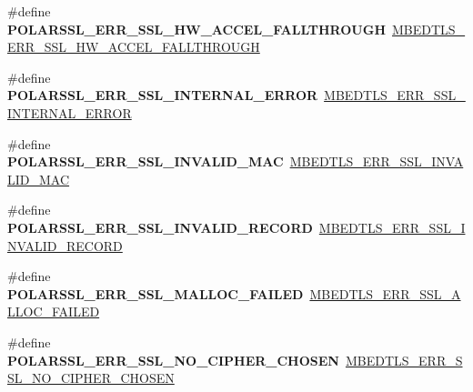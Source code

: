 \begin{DoxyCompactItemize}
\item 
\mbox{\label{compat-1_83_8h_a45a9cd8b2cb96afeed543fc57078e7d8}} 
\#define {\bfseries P\+O\+L\+A\+R\+S\+S\+L\+\_\+\+E\+R\+R\+\_\+\+S\+S\+L\+\_\+\+H\+W\+\_\+\+A\+C\+C\+E\+L\+\_\+\+F\+A\+L\+L\+T\+H\+R\+O\+U\+GH}~\mbox{\hyperlink{ssl_8h_af9328fb82f9548f4fa6bf3a5e1254c65}{M\+B\+E\+D\+T\+L\+S\+\_\+\+E\+R\+R\+\_\+\+S\+S\+L\+\_\+\+H\+W\+\_\+\+A\+C\+C\+E\+L\+\_\+\+F\+A\+L\+L\+T\+H\+R\+O\+U\+GH}}
\item 
\mbox{\label{compat-1_83_8h_a13e4844a3fd06c7dc142f5b8f3985115}} 
\#define {\bfseries P\+O\+L\+A\+R\+S\+S\+L\+\_\+\+E\+R\+R\+\_\+\+S\+S\+L\+\_\+\+I\+N\+T\+E\+R\+N\+A\+L\+\_\+\+E\+R\+R\+OR}~\mbox{\hyperlink{ssl_8h_af06cd02b5bcd36592925c2f63d80f43f}{M\+B\+E\+D\+T\+L\+S\+\_\+\+E\+R\+R\+\_\+\+S\+S\+L\+\_\+\+I\+N\+T\+E\+R\+N\+A\+L\+\_\+\+E\+R\+R\+OR}}
\item 
\mbox{\label{compat-1_83_8h_ac8b3452c48a066a22c809a9d60bc3752}} 
\#define {\bfseries P\+O\+L\+A\+R\+S\+S\+L\+\_\+\+E\+R\+R\+\_\+\+S\+S\+L\+\_\+\+I\+N\+V\+A\+L\+I\+D\+\_\+\+M\+AC}~\mbox{\hyperlink{ssl_8h_ac88e465f67430fba26abeb44f2ac28d5}{M\+B\+E\+D\+T\+L\+S\+\_\+\+E\+R\+R\+\_\+\+S\+S\+L\+\_\+\+I\+N\+V\+A\+L\+I\+D\+\_\+\+M\+AC}}
\item 
\mbox{\label{compat-1_83_8h_a6a1584fe2b857e6d374d086768aaa6b8}} 
\#define {\bfseries P\+O\+L\+A\+R\+S\+S\+L\+\_\+\+E\+R\+R\+\_\+\+S\+S\+L\+\_\+\+I\+N\+V\+A\+L\+I\+D\+\_\+\+R\+E\+C\+O\+RD}~\mbox{\hyperlink{ssl_8h_aad21f6b8a740ef21dd162d91b809e3a4}{M\+B\+E\+D\+T\+L\+S\+\_\+\+E\+R\+R\+\_\+\+S\+S\+L\+\_\+\+I\+N\+V\+A\+L\+I\+D\+\_\+\+R\+E\+C\+O\+RD}}
\item 
\mbox{\label{compat-1_83_8h_af35f4f9525fe3e98f989d2952fff254f}} 
\#define {\bfseries P\+O\+L\+A\+R\+S\+S\+L\+\_\+\+E\+R\+R\+\_\+\+S\+S\+L\+\_\+\+M\+A\+L\+L\+O\+C\+\_\+\+F\+A\+I\+L\+ED}~\mbox{\hyperlink{ssl_8h_a701ee611f7a16a261b306466c8602177}{M\+B\+E\+D\+T\+L\+S\+\_\+\+E\+R\+R\+\_\+\+S\+S\+L\+\_\+\+A\+L\+L\+O\+C\+\_\+\+F\+A\+I\+L\+ED}}
\item 
\mbox{\label{compat-1_83_8h_a95498cade77d8c7db264bf799b2753f5}} 
\#define {\bfseries P\+O\+L\+A\+R\+S\+S\+L\+\_\+\+E\+R\+R\+\_\+\+S\+S\+L\+\_\+\+N\+O\+\_\+\+C\+I\+P\+H\+E\+R\+\_\+\+C\+H\+O\+S\+EN}~\mbox{\hyperlink{ssl_8h_a55ed67b6e414f9b381ff536d9ea6b9c0}{M\+B\+E\+D\+T\+L\+S\+\_\+\+E\+R\+R\+\_\+\+S\+S\+L\+\_\+\+N\+O\+\_\+\+C\+I\+P\+H\+E\+R\+\_\+\+C\+H\+O\+S\+EN}}

\end{DoxyCompactItemize}
